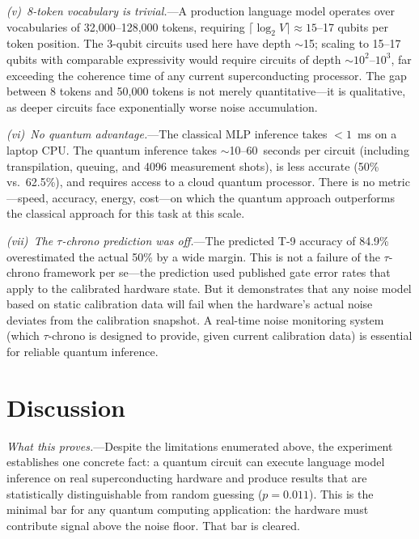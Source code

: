 \documentclass[prl,twocolumn,superscriptaddress,longbibliography,floatfix]{revtex4-2}
\begin{document}
\emph{(v)~8-token vocabulary is trivial.}---A production language model operates over vocabularies of 32,000--128,000 tokens, requiring $\lceil \log_2 V \rceil \approx 15$--17 qubits per token position. The 3-qubit circuits used here have depth $\sim$15; scaling to 15--17 qubits with comparable expressivity would require circuits of depth $\sim$$10^2$--$10^3$, far exceeding the coherence time of any current superconducting processor. The gap between 8 tokens and 50,000 tokens is not merely quantitative---it is qualitative, as deeper circuits face exponentially worse noise accumulation.

\emph{(vi)~No quantum advantage.}---The classical MLP inference takes $< 1$~ms on a laptop CPU. The quantum inference takes $\sim$10--60~seconds per circuit (including transpilation, queuing, and 4096 measurement shots), is less accurate (50\% vs.\ 62.5\%), and requires access to a cloud quantum processor. There is no metric---speed, accuracy, energy, cost---on which the quantum approach outperforms the classical approach for this task at this scale.

\emph{(vii)~The $\tau$-chrono prediction was off.}---The predicted T-9 accuracy of 84.9\% overestimated the actual 50\% by a wide margin. This is not a failure of the $\tau$-chrono framework per se---the prediction used published gate error rates that apply to the calibrated hardware state. But it demonstrates that any noise model based on static calibration data will fail when the hardware's actual noise deviates from the calibration snapshot. A real-time noise monitoring system (which $\tau$-chrono is designed to provide, given current calibration data) is essential for reliable quantum inference.

\section{Discussion}

\emph{What this proves.}---Despite the limitations enumerated above, the experiment establishes one concrete fact: a quantum circuit can execute language model inference on real superconducting hardware and produce results that are statistically distinguishable from random guessing ($p = 0.011$). This is the minimal bar for any quantum computing application: the hardware must contribute signal above the noise floor. That bar is cleared.
\end{document}
